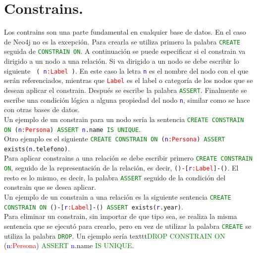 \documentclass[conference]{IEEEtran}
\begin{document}
\section{Constrains.}
Los contrains son una parte fundamental en cualquier base de datos. En el caso de Neo4j no es la excepción. Para crearla se utiliza primero la palabra \texttt{\textcolor{green}{CREATE}} seguida de \texttt{\textcolor{green}{CONSTRAIN ON}}. A continuación se puede especificar si el constrain va dirigido a un nodo a una relación. Si va dirigido a un nodo se debe escribir lo siguiente \texttt{ ( \textcolor{blue}{n}\textcolor{red}{:Label} )}. En este caso la letra \texttt{\textcolor{blue}{n}} es el nombre del nodo con el que serán referenciados, mientras que \texttt{\textcolor{red}{Label}} es el label o categoría de los nodos que se desean aplicar el constrain. Después se escribe la palabra \texttt{\textcolor{green}{ASSERT}}. Finalmente se escribe una condición lógica a alguna propiedad del nodo \texttt{\textcolor{blue}{n}}, similar como se hace con otras bases de datos.
\\
Un ejemplo de un constrain para un nodo sería la sentencia  \texttt{\textcolor{green}{CREATE CONSTRAIN ON} (\textcolor{blue}{n}\textcolor{red}{:Persona}) \textcolor{green}{ASSERT} \textcolor{blue}{n}.name \textcolor{green}{IS UNIQUE}}. 
\\
Otro ejemplo es el siguiente  \texttt{\textcolor{green}{CREATE CONSTRAIN ON} (\textcolor{blue}{n}\textcolor{red}{:Persona}) \textcolor{green}{ASSERT} exists(\textcolor{blue}{n}.telefono)}.
\\
Para aplicar constrains a una relación se debe escribir primero \texttt{\textcolor{green}{CREATE CONSTRAIN ON}}, seguido de la representación de la relación, es decir, \texttt{()-[\textcolor{blue}{r}\textcolor{red}{:Label}]-()}. El resto es lo mismo, es decir, la palabra \texttt{\textcolor{green}{ASSERT}} seguido de la condición del constrain que se desea aplicar. 
\\
Un ejemplo de un constrain a una relación es la siguiente sentencia \texttt{\textcolor{green}{CREATE CONSTRAIN ON} ()-[\textcolor{blue}{r}\textcolor{red}{:Label}]-() \textcolor{green}{ASSERT} exists(\textcolor{blue}{r}.year)}.
\\
Para eliminar un constrain, sin importar de que tipo sea, se realiza la misma sentencia que se ejecutó para crearlo, pero en vez de utilizar la palabra  \texttt{\textcolor{green}{CREATE}} se utiliza la palabra  \texttt{\textcolor{green}{DROP}}. Un ejemplo sería texttt{\textcolor{green}{DROP CONSTRAIN ON} (\textcolor{blue}{n}\textcolor{red}{:Persona}) \textcolor{green}{ASSERT} \textcolor{blue}{n}.name \textcolor{green}{IS UNIQUE}}.
\end{document}
